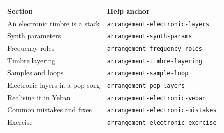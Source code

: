 \begin{helpmapping}
\begin{longtable}{p{}p{}}
\toprule
Section & Help anchor \\
\midrule
An electronic timbre is a stack & \texttt{arrangement-electronic-layers} \\
Synth parameters & \texttt{arrangement-synth-params} \\
Frequency roles & \texttt{arrangement-frequency-roles} \\
Timbre layering & \texttt{arrangement-timbre-layering} \\
Samples and loops & \texttt{arrangement-sample-loop} \\
Electronic layers in a pop song & \texttt{arrangement-pop-layers} \\
Realising it in Yeban & \texttt{arrangement-electronic-yeban} \\
Common mistakes and fixes & \texttt{arrangement-electronic-mistakes} \\
Exercise & \texttt{arrangement-electronic-exercise} \\
\bottomrule
\end{longtable}
\end{helpmapping}
